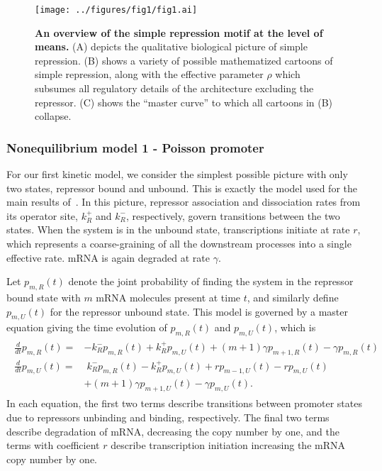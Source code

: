 \documentclass[12pt]{article}%
\newcommand{\deriv}[2][{}]{\frac{d #1}{d #2}}
\begin{document}
\begin{figure}%
\centering
\texttt{[image: ../figures/fig1/fig1.ai]}
\caption{
\textbf{
An overview of the simple repression motif at the level of means.}
(A) depicts the qualitative biological picture of simple repression.
(B) shows a variety of possible mathematized cartoons of simple
repression, along with the effective parameter $\rho$
which subsumes all regulatory details
of the architecture excluding the repressor.
(C) shows the ``master curve'' to which all cartoons in (B) collapse.
}
\label{fig1:means_cartoons}
\end{figure}

\subsubsection{Nonequilibrium model 1 - Poisson promoter}
For our first kinetic model, we consider the simplest possible
picture with only two states, repressor bound and unbound.
This is exactly the model used for the main results of~\cite{Jones2014}.
In this picture, repressor association and dissociation rates
from its operator site, $k_R^+$ and $k_R^-$, respectively, govern
transitions between the two states. When the system is in the
unbound state, transcriptions initiate at rate $r$, which
represents a coarse-graining of all the downstream processes into
a single effective rate. mRNA is again degraded at rate $\gamma$.

Let $p_{m,R}(t)$ denote the joint probability of finding the
system in the repressor bound state with $m$ mRNA molecules
present at time $t$, and similarly define $p_{m,U}(t)$ for the
repressor unbound state. 
This model is governed by a master equation giving the time
evolution of $p_{m,R}(t)$ and $p_{m,U}(t)$, which is
\begin{align}
\begin{split}
\deriv{t}p_{m,R}(t) =& - k_R^- p_{m,R}(t) + k_R^+ p_{m,U}(t)
                + (m+1)\gamma p_{m+1,R}(t) - \gamma p_{m,R}(t)
\\
\deriv{t}p_{m,U}(t) =&\; k_R^- p_{m,R}(t) - k_R^+ p_{m,U}(t)
                        + rp_{m-1,U}(t) - rp_{m,U}(t)
                \\
                &+ (m+1)\gamma p_{m+1,U}(t) - \gamma p_{m,U}(t).
\label{eq:poisson_promoter_cme}
\end{split}
\end{align}
In each equation, the first two terms describe transitions
between promoter states due to repressors unbinding and binding,
respectively. The final two terms describe degradation of mRNA,
decreasing the copy number by one, and the terms with coefficient
$r$ describe transcription initiation increasing the mRNA copy
number by one.
\end{document}
